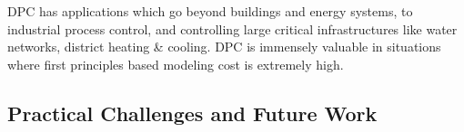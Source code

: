 DPC has applications which go beyond buildings and energy systems, to industrial process control, and controlling large critical infrastructures like water networks, district heating \& cooling. DPC is immensely valuable in situations where first principles based modeling cost is extremely high.

\subsection{Practical Challenges and Future Work}
\label{SS:challenges}
